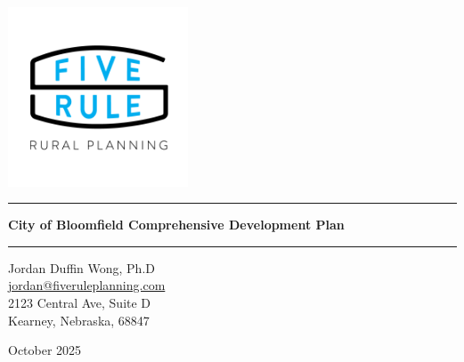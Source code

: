 \begin{titlepage}

\BgThispage


\begin{center}

\vspace{2cm}
\includegraphics[width=0.4\textwidth]{assets/five_rule_logo.png}~\\[1cm]

\hrule
\vspace{.5cm}
{ \huge \bfseries City of Bloomfield Comprehensive Development Plan} %
\vspace{.5cm}

\hrule
\vspace{1.5cm}

\Large
Jordan Duffin Wong, Ph.D\\
\url{jordan@fiveruleplanning.com}\\
2123 Central Ave, Suite D\\
Kearney, Nebraska, 68847

\vspace{2cm}

\centering October 2025
\end{center}
\end{titlepage}